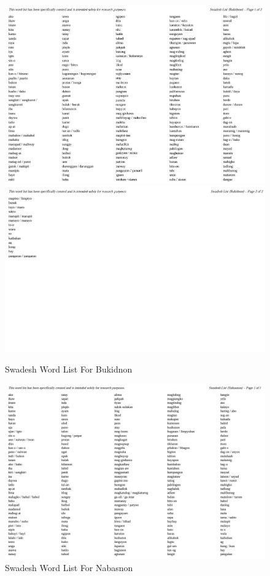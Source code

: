 \begin{figure}[h!]
	\centering
	\includegraphics[width=\textwidth]{./appendix/swadesh_bukidnon1.png}
	\includegraphics[width=\textwidth]{./appendix/swadesh_bukidnon2.png}
	\caption{Swadesh Word List For Bukidnon}
	\label{fig:swadeshBukidnon}
\end{figure}

\begin{figure}[h!]
	\centering
	\includegraphics[width=\textwidth]{./appendix/swadesh_nabasnon.png}
	\caption{Swadesh Word List For Nabasnon}
	\label{fig:swadeshNabasnon}
\end{figure}

